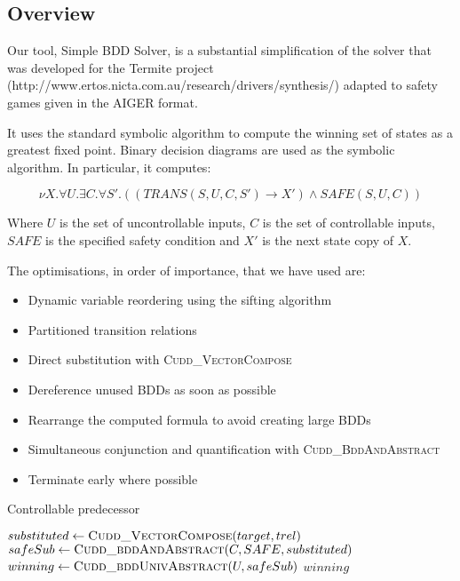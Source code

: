 \subsection{Overview}
Our tool, Simple BDD Solver, is a substantial simplification of the solver that was developed for the Termite project (http://www.ertos.nicta.com.au/research/drivers/synthesis/) adapted to safety games given in the AIGER format. 

It uses the standard symbolic algorithm to compute the winning set of states as a greatest fixed point. Binary decision diagrams are used as the symbolic algorithm. In particular, it computes:

\begin{equation}
\label{eqn:mu}
\nu X. \forall U. \exists C. \forall S'. ((TRANS(S, U, C, S') \rightarrow X') \wedge SAFE(S, U, C))
\end{equation}

Where $U$ is the set of uncontrollable inputs, $C$ is the set of controllable inputs, $SAFE$ is the specified safety condition and $X'$ is the next state copy of $X$.

The optimisations, in order of importance, that we have used are:
\begin{itemize}
    \item Dynamic variable reordering using the sifting algorithm
    \item Partitioned transition relations
    \item Direct substitution with \textsc{Cudd\_VectorCompose}
    \item Dereference unused BDDs as soon as possible
    \item Rearrange the computed formula to avoid creating large BDDs
    \item Simultaneous conjunction and quantification with \textsc{Cudd\_BddAndAbstract}
    \item Terminate early where possible
\end{itemize}

\begin{algorithm}
\caption{Controllable predecessor}
\label{alg:syntcomp_cpre}

\begin{algorithmic}

\State $substituted \gets \Call{Cudd\_VectorCompose}{target, trel}$
\State $safeSub     \gets \Call{Cudd\_bddAndAbstract}{C, SAFE, substituted}$
\State $winning     \gets \Call{Cudd\_bddUnivAbstract}{U, safeSub}$
\State \Return $winning$

\end{algorithmic}
\end{algorithm}

